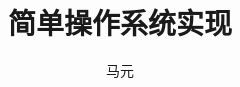 \documentclass{swfuproposal}
\title{简单操作系统实现}
\author{马元}
\begin{document}
\makeproposal{}
\end{document}
